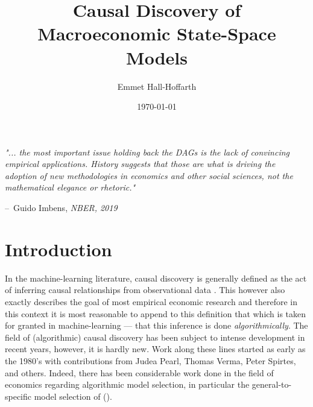 \documentclass{article}
\title{Causal Discovery of Macroeconomic State-Space Models}
\author{Emmet Hall-Hoffarth}
\date{\today}
\makeatletter
\newenvironment{chapquote}[2][2em]
  {\setlength{\@tempdima}{#1}%
   \def\chapquote@author{#2}%
   \parshape 1 \@tempdima \dimexpr\textwidth-2\@tempdima\relax%
   \itshape}
  {\par\normalfont\hfill--\ \chapquote@author\hspace*{\@tempdima}\par\bigskip}
\makeatother
\begin{document}
\maketitle


\vspace{1cm}

\begin{chapquote}{Guido Imbens, \textit{NBER, 2019}}
  "... the most important issue holding back the DAGs is the lack of convincing empirical applications. History suggests that those are what is driving the adoption of new methodologies in economics and other social sciences,  not the mathematical elegance or rhetoric."
\end{chapquote}

\section{Introduction}

In the machine-learning literature, causal discovery is generally defined as the act of inferring causal relationships from observational data \parencite{huang2020causal}. This however also exactly describes the goal of most empirical economic research and therefore in this context it is most reasonable to append to this definition that which is taken for granted in machine-learning --- that this inference is done \textit{algorithmically}. The field of (algorithmic) causal discovery has been subject to intense development in recent years, however, it is hardly new. Work along these lines started as early as the 1980's with contributions from Judea Pearl, Thomas Verma, Peter Spirtes, and others. Indeed, there has been considerable work done in the field of economics regarding algorithmic model selection, in particular the general-to-specific model selection of \citeauthor{krolzig2001computer} (\citeyear{krolzig2001computer}).
\end{document}
